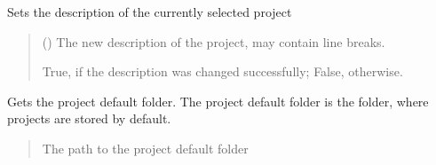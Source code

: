 \documentclass[letterpaper,10pt,english]{sphinxmanual}
\begin{document}
\begin{fulllineitems}
\begin{fulllineitems}
\begin{quote}
\begin{description}
\sphinxAtStartPar
{}

\end{description}\end{quote}

\end{fulllineitems}


\begin{fulllineitems}
\label{\detokenize{apidoc/src.osm_configurator.control:src.osm_configurator.control.control_interface.IControl.set_project_description}}
\pysigstartsignatures
{}
\pysigstopsignatures
\sphinxAtStartPar
Sets the description of the currently selected project
\begin{quote}\begin{description}
\sphinxAtStartPar
{} () \textendash{} The new description of the project, may contain line breaks.

\sphinxAtStartPar
True, if the description was changed successfully; False, otherwise.

\sphinxAtStartPar
{}

\end{description}\end{quote}

\end{fulllineitems}


\begin{fulllineitems}
\label{\detokenize{apidoc/src.osm_configurator.control:src.osm_configurator.control.control_interface.IControl.get_project_default_folder}}
\pysigstartsignatures
{}
\pysigstopsignatures
\sphinxAtStartPar
Gets the project default folder.
The project default folder is the folder, where projects are stored by default.
\begin{quote}\begin{description}
\sphinxAtStartPar
The path to the project default folder


\end{description}
\end{quote}
\end{fulllineitems}
\end{fulllineitems}
\end{document}
